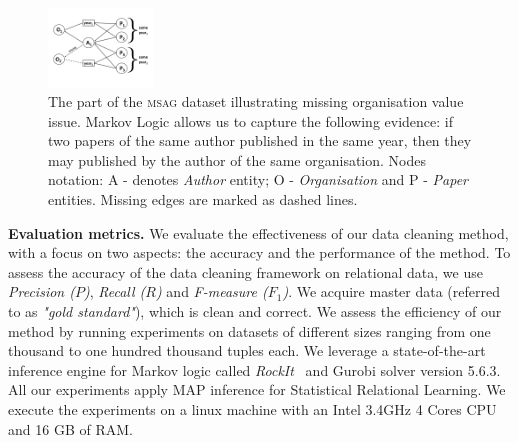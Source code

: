 \begin{figure}[t]
    \centering
    \includegraphics[width=0.25\textwidth, trim = 0mm 4mm 0mm 5mm, clip]{img/graph01.png}
    \caption{The part of the \textsc{msag} dataset illustrating missing organisation value issue. Markov Logic allows us to capture the following evidence: if two papers of the same author published in the same year, then they may published by the author of the same organisation. Nodes notation: A - denotes \textit{Author} entity; O - \textit{Organisation} and P - \textit{Paper} entities. Missing edges are marked as dashed lines.}
    \label{fig:msagmissing}
\end{figure}

\textbf{Evaluation metrics.} We evaluate the effectiveness of our data cleaning method, with a focus on two aspects: the accuracy and the performance of the method. To assess the accuracy of the data cleaning framework on relational data, we use \textit{Precision ($P$)}, \textit{Recall ($R$)} and \textit{F-measure ($F_1$)}. We acquire master data (referred to as \textit{"gold standard"}), which is clean and correct. We assess the efficiency of our method by running experiments on datasets of different sizes ranging from one thousand to one hundred thousand tuples each. We leverage a state-of-the-art inference engine for Markov logic called \textit{RockIt}~\cite{NoessnerNS13} and Gurobi solver version 5.6.3. All our experiments apply MAP inference for Statistical Relational Learning. We execute the experiments on a linux machine with an Intel 3.4GHz 4 Cores CPU and 16 GB of RAM.





